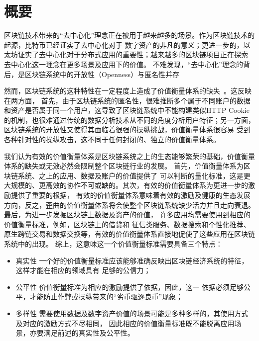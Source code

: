 
\section{概要}

区块链技术带来的“去中心化”理念正在被用于越来越多的场景。作为区块链技术的起源，比特币已经证实了去中心化对于
数字资产的非凡的意义；更进一步的，以太坊证实了去中心化对于分布式应用的重要性；越来越多的区块链项目正在探索
去中心化这一理念在更多场景及应用下的价值。
不难发现，“去中心化”理念的背后，是区块链系统中的开放性（Openness）与匿名性并存

然而，区块链系统的这种特性在一定程度上造成了价值衡量体系的缺失~\cite{meiklejohn2013fistful}。这反映在两方面，
首先，由于区块链系统的匿名性，很难推断多个属于不同账户的数据和资产是否属于同一个用户，这导致了区块链系统中不能构建类似HTTP Cookie~\cite{Cookie}
的机制，也很难通过传统的数据分析技术从不同的角度分析用户特征；另一方面，区块链系统的开放性又使得其面临着很强的操纵挑战，价值衡量体系很容易
受到各种针对性的操纵攻击，这不同于任何封闭的、独立的价值衡量体系。

我们认为有效的价值衡量体系是区块链系统之上的生态能够繁荣的基础，价值衡量体系的缺失或无效必然会限制整个区块链行业的发展。
首先，价值衡量体系为区块链系统、之上的应用、数据及账户的价值提供了
可以判断的量化标准，这是更大规模的、更高效的协作不可或缺的。其次，有效的价值衡量体系为更进一步的激励提供了重要的根据，
有效的价值衡量体系意味着有效的激励及健康的生态发展方向，反之，歪曲的价值衡量体系将会使整个区块链系统缺少活力并且走向衰退。
最后，为进一步发掘区块链上数据及资产的价值，
许多应用均需要使用到相应的价值衡量标准，例如，区块链上的借贷和
征信类服务、数据搜索和个性化推荐、原生跨链交易和数据交换等，有效的价值衡量体系直接地促使了这些应用在区块链系统中的出现。
综上，这意味这一个价值衡量标准需要具备三个特点：
\begin{itemize}
\item{真实性} 一个好的价值衡量标准应该能够准确反映出区块链经济系统的特征，这样才能在相应的领域具有
足够的公信力；
\item{公平性} 价值衡量标准为相应的激励提供了依据，因此，这一
依据必须足够公平，才能防止作弊或操纵带来的“劣币驱逐良币”现象；
\item{多样性} 需要使用数据及数字资产价值的场景可能是多种多样的，其使用方式及对应的激励方式不尽相同，
因此相应的价值衡量标准既不能脱离应用场景，亦要满足前述的真实性及公平性。
\end{itemize}


